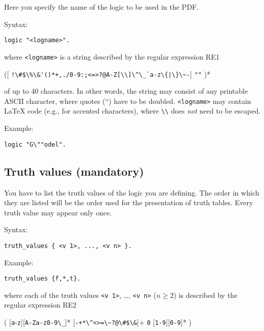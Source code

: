 \documentclass[
]{article}
\newcommand{\passthrough}[1]{#1}
\begin{document}
Here you specify the name of the logic to be used in the PDF.

Syntax:

\begin{lstlisting}
logic "<logname>".
\end{lstlisting}

where \passthrough{\lstinline!<logname>!} is a string described by the
regular expression RE1

({[}
\passthrough{\lstinline"!\#$\%\&'()*+,./0-9:;<=>?@A-Z[\\]\^\_`a-z\{|\}\~-"}{]}
\textbar{} \passthrough{\lstinline!""!} )*

of up to 40 characters. In other words, the string may consist of any
printable ASCII character, where quotes (``) have to be doubled.
\passthrough{\lstinline!<logname>!} may contain LaTeX code (e.g., for
accented characters), where \passthrough{\lstinline!\\!} does \emph{not}
need to be escaped.

Example:

\begin{lstlisting}
logic "G\""odel".
\end{lstlisting}

\hypertarget{truth-values-mandatory}{%
\subsection{Truth values (mandatory)}\label{truth-values-mandatory}}

You have to list the truth values of the logic you are defining. The
order in which they are listed will be the order used for the
presentation of truth tables. Every truth value may appear only once.

Syntax:

\begin{lstlisting}
truth_values { <v 1>, ..., <v n> }.
\end{lstlisting}

Example:

\begin{lstlisting}
truth_values {f,*,t}.
\end{lstlisting}

where each of the truth values \passthrough{\lstinline!<v 1>!}, \ldots,
\passthrough{\lstinline!<v n>!} (\(n \ge 2\)) is described by the
regular expression RE2

(
{[}\passthrough{\lstinline!a!}-\passthrough{\lstinline!z!}{]}{[}\passthrough{\lstinline!A-Za-z0-9\_!}{]}*
\textbar{} {[}\passthrough{\lstinline!-+*\^<>=\~?@\#$\&!}{]}+ \textbar{}
\passthrough{\lstinline!0!} \textbar{}
{[}\passthrough{\lstinline!1-9!}{]}{[}\passthrough{\lstinline!0-9!}{]}*
)
\end{document}
